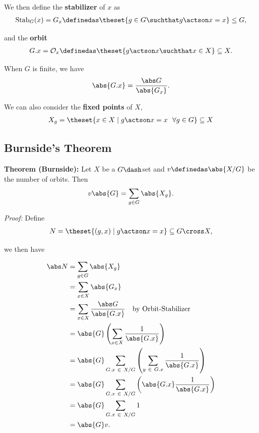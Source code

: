 We then define the \textbf{stabilizer} of \(x\) as
\begin{align*}
\mathrm{Stab}_G(x) = G_x \definedas \theset{g\in G \suchthat g\actson x = x} \leq G,
\end{align*}

and the \textbf{orbit}
\begin{align*}
G.x = \mathcal O_x \definedas \theset{g\actson x \suchthat x\in X} \subseteq X.
\end{align*}

When \(G\) is finite, we have
\begin{align*}
\abs{G.x}  = \frac{\abs G}{\abs{G_x}}.
\end{align*}

We can also consider the \textbf{fixed points} of \(X\),
\begin{align*}
X_g = \theset{x\in X \mid g\actson x = x ~~\forall g\in G} \subseteq X
\end{align*}

\hypertarget{burnsides-theorem}{%
\subsection{Burnside's Theorem}\label{burnsides-theorem}}

\textbf{Theorem (Burnside):} Let \(X\) be a \(G\dash\)set and
\(v \definedas \abs{X/G}\) be the number of orbits. Then
\begin{align*}
v \abs{G} = \sum_{g\in G} \abs{X_g}.
\end{align*}

\emph{Proof:} Define
\begin{align*}
N = \theset{(g,x) \mid g\actson x = x} \subseteq G \cross X
,\end{align*}

we then have

\begin{align*}
\abs N &= \sum_{g\in G} \abs{X_g} \\
&= \sum_{x\in X} \abs{G_x} \\
&= \sum_{x\in X} \frac{\abs G}{\abs {G.x}} \quad\text{by Orbit-Stabilizer} \\
&= \abs{G} \left( \sum_{x\in X} \frac{1}{\abs{G.x}} \right) \\
&= \abs{G} \sum_{G.x ~\in~ X/G} \left( \sum_{y ~\in~ G.x} \frac{1}{\abs{G.x}} \right) \\
&= \abs{G} \sum_{G.x ~\in~ X/G} \left(
\abs{G.x} \frac{1}{\abs{G.x}}
\right) \\
&= \abs{G} \sum_{G.x ~\in~ X/G} 1 \\
&= \abs{G} v
.\end{align*}

